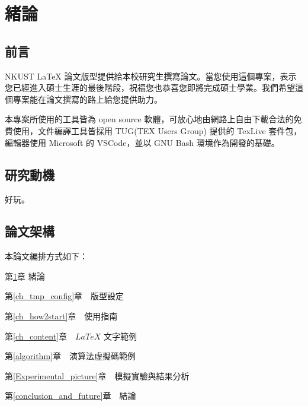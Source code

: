 
\chapter{緒論}\label{introduction}


\section{前言}\label{preface}

NKUST LaTeX 論文版型提供給本校研究生撰寫論文。當您使用這個專案，表示您已經進入碩士生涯的最後階段，祝福您也恭喜您即將完成碩士學業。我們希望這個專案能在論文撰寫的路上給您提供助力。

本專案所使用的工具皆為 open source 軟體，可放心地由網路上自由下載合法的免費使用，文件編譯工具皆採用 TUG(TEX Users Group) 提供的 TexLive 套件包，編輯器使用 Microsoft 的 VSCode，並以 GNU Bash 環境作為開發的基礎。

\newpage

\section{研究動機}\label{motive}

好玩。


\newpage

\section{論文架構}\label{thesis_arch}
\n 本論文編排方式如下：

第\ref{introduction}章  緒論

第\ref{ch_tmp_config}章　版型設定

第\ref{ch_how2start}章　使用指南

第\ref{ch_content}章　$LaTeX$ 文字範例

第\ref{algorithm}章　演算法虛擬碼範例

第\ref{Experimental_picture}章　模擬實驗與結果分析

第\ref{conclusion_and_future}章　結論
